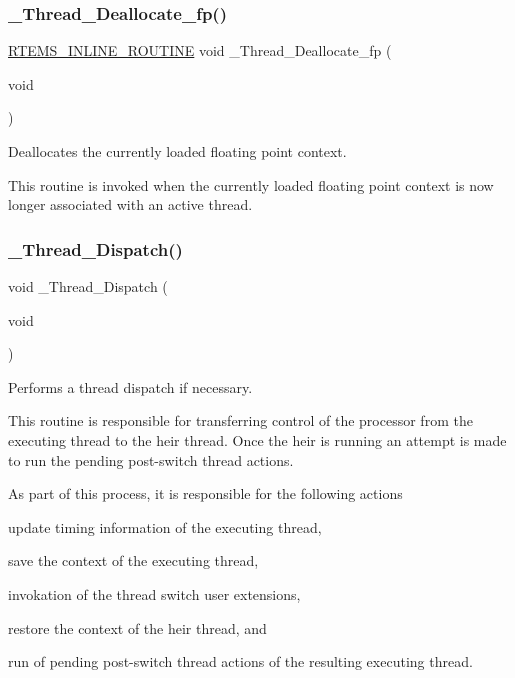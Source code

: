 \subsubsection{\texorpdfstring{\_Thread\_Deallocate\_fp()}{\_Thread\_Deallocate\_fp()}}
{\footnotesize\ttfamily \mbox{\hyperlink{group__RTEMSScoreBaseDefs_gac216239df231d5dbd15e3520b0b9313f}{R\+T\+E\+M\+S\+\_\+\+I\+N\+L\+I\+N\+E\+\_\+\+R\+O\+U\+T\+I\+NE}} void \+\_\+\+Thread\+\_\+\+Deallocate\+\_\+fp (\begin{DoxyParamCaption}\item[{void}]{ }\end{DoxyParamCaption})}



Deallocates the currently loaded floating point context. 

This routine is invoked when the currently loaded floating point context is now longer associated with an active thread. \mbox{\label{group__RTEMSScoreThread_ga14e949c0f400cda43b1e7547e50b088d}} 
\subsubsection{\texorpdfstring{\_Thread\_Dispatch()}{\_Thread\_Dispatch()}}
{\footnotesize\ttfamily void \+\_\+\+Thread\+\_\+\+Dispatch (\begin{DoxyParamCaption}\item[{void}]{ }\end{DoxyParamCaption})}



Performs a thread dispatch if necessary. 

This routine is responsible for transferring control of the processor from the executing thread to the heir thread. Once the heir is running an attempt is made to run the pending post-\/switch thread actions.

As part of this process, it is responsible for the following actions
\begin{DoxyItemize}
\item update timing information of the executing thread,
\item save the context of the executing thread,
\item invokation of the thread switch user extensions,
\item restore the context of the heir thread, and
\item run of pending post-\/switch thread actions of the resulting executing thread.
\end{DoxyItemize}

